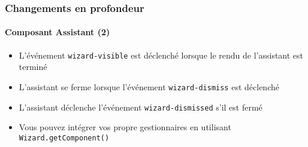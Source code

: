 \begin{frame}[fragile]
	\frametitle{Changements en profondeur}
	\framesubtitle{Composant Assistant (2)}

	\lstset{basicstyle=\tiny\ttfamily}

	\begin{itemize}

		\item L'événement \texttt{wizard-visible} est déclenché lorsque le rendu de l'assistant est terminé

		\item L'assistant se ferme lorsque l'événement \texttt{wizard-dismiss} est déclenché

		\item L'assistant déclenche l'événement \texttt{wizard-dismissed} s'il est fermé

		\item Vous pouvez intégrer vos propre gestionnaires en utilisant \texttt{Wizard.getComponent()}

	\end{itemize}

\end{frame}

